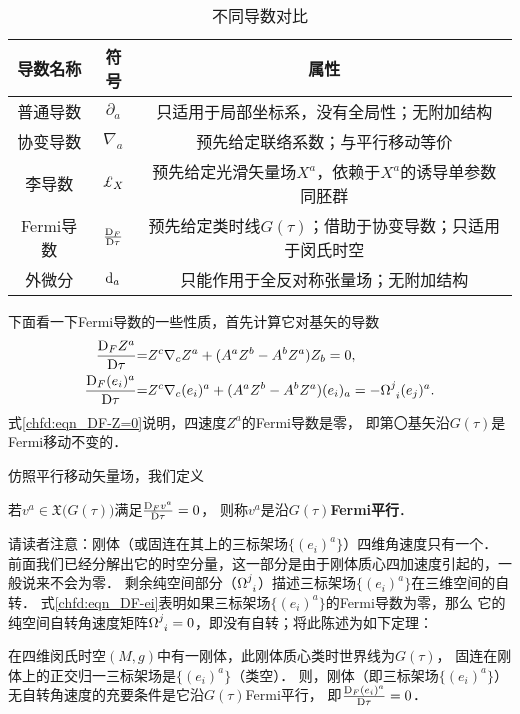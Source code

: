 \begin{table}[htb]
    \centering
    \caption{不同导数对比} \label{chfd:tab-Derivative-all}
    \begin{tabular}{|*3{c|}}
        \hline
        导数名称 & 符号 & 属性 \\ \hline
        普通导数 & $\partial_a $ & 只适用于局部坐标系，没有全局性；无附加结构     \\ \hline
        协变导数 & $\nabla_a$ & 预先给定联络系数；与平行移动等价 \\ \hline
        李导数 & $\Lie_{X}$ & 预先给定光滑矢量场$X^a$，依赖于$X^a$的诱导单参数同胚群 \\ \hline
        Fermi导数 & $\frac{{\rm D}_F }{{\rm D}\tau}$ &
             预先给定类时线$G(\tau)$；借助于协变导数；只适用于闵氏时空 \\ \hline
        外微分 & ${\rm d}_a$ & 只能作用于全反对称张量场；无附加结构 \\ \hline
    \end{tabular}
\end{table}


下面看一下Fermi导数的一些性质，首先计算它对基矢的导数
\begin{align}
    \frac{{\rm D}_F Z^a}{{\rm D}\tau} &{=} Z^c \nabla_c Z^a +(A^a Z^b-A^b Z^a) Z_b = 0,
       \label{chfd:eqn_DF-Z=0}\\
    \frac{{\rm D}_F (e_i)^a}{{\rm D}\tau} &{=} Z^c \nabla_c (e_i)^a +(A^a Z^b-A^b Z^a) (e_i)_a
    = -\Omega^{j}_{\hphantom{j} i} (e_j)^a . \label{chfd:eqn_DF-ei}
\end{align}
式\eqref{chfd:eqn_DF-Z=0}说明，四速度$Z^a$的Fermi导数是零，
即第〇基矢沿$G(\tau)$是Fermi移动不变的．

仿照平行移动矢量场，我们定义
\begin{definition}
    若$v^a\in \mathfrak{X}\bigl(G(\tau)\bigr)$满足$\frac{{\rm D}_F v^a}{{\rm D}\tau}=0$，
    则称$v^a$是沿$G(\tau)${\heiti\bfseries Fermi平行}．
\end{definition}

请读者注意：刚体（或固连在其上的三标架场$\{(e_i)^a\}$）四维角速度只有一个．
前面我们已经分解出它的时空分量，这一部分是由于刚体质心四加速度引起的，一般说来不会为零．
剩余纯空间部分（$\Omega^{j}_{\hphantom{j} i}$）描述三标架场$\{(e_i)^a\}$在三维空间的自转．
式\eqref{chfd:eqn_DF-ei}表明如果三标架场$\{(e_i)^a\}$的Fermi导数为零，那么
它的纯空间自转角速度矩阵$\Omega^{j}_{\hphantom{j} i}=0$，即没有自转；将此陈述为如下定理：

\begin{theorem}\label{chfd:thm_FermiD-rotation}
    在四维闵氏时空$(M,g)$中有一刚体，此刚体质心类时世界线为$G(\tau)$，
    固连在刚体上的正交归一三标架场是$\{(e_i)^a\}$（类空）．
    则，刚体（即三标架场$\{(e_i)^a\}$）
    无自转角速度的充要条件是它沿$G(\tau)$Fermi平行，
    即$\frac{{\rm D}_F (e_i)^a}{{\rm D}\tau}=0$．
\end{theorem}


